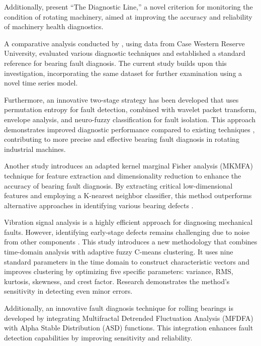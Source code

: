 \documentclass[sn-basic,pdflatex]{sn-jnl}
\theoremstyle{remark}
\theoremstyle{definition}
\begin{document}
Additionally, \citet{WOS:000366534900022} present ``The Diagnostic
Line,'' a novel criterion for monitoring the condition of rotating
machinery, aimed at improving the accuracy and reliability of machinery
health diagnostics.

A comparative analysis conducted by \citet{WOS:000357230900007}, using
data from Case Western Reserve University, evaluated various diagnostic
techniques and established a standard reference for bearing fault
diagnosis. The current study builds upon this investigation,
incorporating the same dataset for further examination using a novel
time series model.

Furthermore, an innovative two-stage strategy has been developed that
uses permutation entropy for fault detection, combined with wavelet
packet transform, envelope analysis, and neuro-fuzzy classification for
fault isolation. This approach demonstrates improved diagnostic
performance compared to existing techniques
\citep{WOS:000385104500001, Rajabi2022}, contributing to more precise
and effective bearing fault diagnosis in rotating industrial machines.

Another study introduces an adapted kernel marginal Fisher analysis
(MKMFA) technique for feature extraction and dimensionality reduction to
enhance the accuracy of bearing fault diagnosis. By extracting critical
low-dimensional features and employing a K-nearest neighbor classifier,
this method outperforms alternative approaches in identifying various
bearing defects \citep{WOS:000392016300001}.

Vibration signal analysis is a highly efficient approach for diagnosing
mechanical faults. However, identifying early-stage defects remains
challenging due to noise from other components
\citep{WOS:000369301600001, WOS:000367992900001}. This study introduces
a new methodology that combines time-domain analysis with adaptive fuzzy
C-means clustering. It uses nine standard parameters in the time domain
to construct characteristic vectors and improves clustering by
optimizing five specific parameters: variance, RMS, kurtosis, skewness,
and crest factor. Research demonstrates the method's sensitivity in
detecting even minor errors.

Additionally, an innovative fault diagnosis technique for rolling
bearings is developed by integrating Multifractal Detrended Fluctuation
Analysis (MFDFA) with Alpha Stable Distribution (ASD) functions. This
integration enhances fault detection capabilities by improving
sensitivity and reliability.
\end{document}

